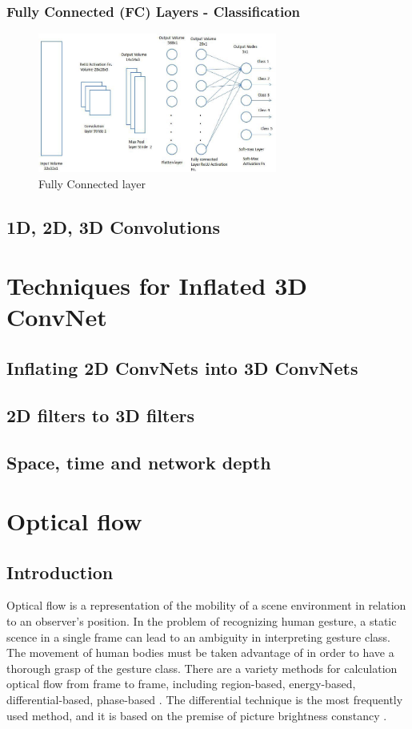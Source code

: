 \documentclass[a4paper, 12pt]{article}
\begin{document}
\subsubsection{Fully Connected (FC) Layers - Classification}

\begin{figure}[H]
    \centering
    \includegraphics[width=0.7\textwidth]{Fully connected.jpeg}
    \caption{Fully Connected layer \citep{}}
    \label{Figure}
\end{figure}




\subsection{1D, 2D, 3D Convolutions}

\section{Techniques for Inflated 3D ConvNet}
\subsection{Inflating 2D ConvNets into 3D ConvNets}
\subsection{2D filters to 3D filters}
\subsection{Space, time and network depth}

\section{Optical flow}
\subsection{Introduction}
Optical flow is a representation of the mobility of a scene environment in relation to an observer's position. In the problem of recognizing human gesture, a static scence in a single frame can lead to an ambiguity in interpreting gesture class.  The movement of human bodies must be taken advantage of in order to have a thorough grasp of the gesture class. There are a variety methods for calculation optical flow from frame to frame, including region-based, energy-based, differential-based, phase-based \citep{marco2018computer}. The differential technique is the most frequently used method, and it is based on the premise of picture brightness constancy \citep{horn1981determining}.
\end{document}
